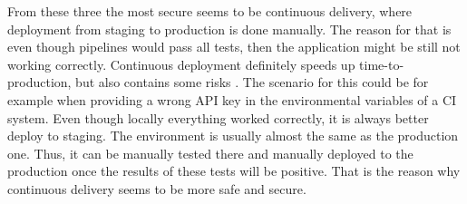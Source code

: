 \documentclass{article} %
\begin{document}
\newline
From these three the most secure seems to be continuous delivery, where deployment from staging to production is done manually. The reason for that is even though pipelines would pass all tests, then the application might be still not working correctly. Continuous deployment definitely speeds up time-to-production, but also contains some risks \cite{bib:security_cde}. The scenario for this could be for example when providing a wrong API key in the environmental variables of a CI system. Even though locally everything worked correctly, it is always better deploy to staging. The environment is usually almost the same as the production one. Thus, it can be manually tested there and manually deployed to the production once the results of these tests will be positive. That is the reason why continuous delivery seems to be more safe and secure.
\end{document}
